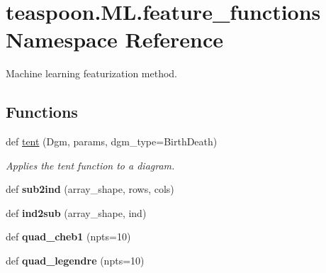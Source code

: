 \hypertarget{namespaceteaspoon_1_1_m_l_1_1feature__functions}{}\section{teaspoon.\+M\+L.\+feature\+\_\+functions Namespace Reference}
\label{namespaceteaspoon_1_1_m_l_1_1feature__functions}


Machine learning featurization method.  


\subsection*{Functions}
\begin{DoxyCompactItemize}
\item 
def \hyperlink{namespaceteaspoon_1_1_m_l_1_1feature__functions_ace7b405ff91ce6e4cd8f568a4f1dae29}{tent} (Dgm, params, dgm\+\_\+type=\textquotesingle{}Birth\+Death\textquotesingle{})
\begin{DoxyCompactList}\small\item\em Applies the tent function to a diagram. \end{DoxyCompactList}\item 
\mbox{\label{namespaceteaspoon_1_1_m_l_1_1feature__functions_adee0f8231e7fc52be86d4d4e0a2e6eac}} 
def {\bfseries sub2ind} (array\+\_\+shape, rows, cols)
\item 
\mbox{\label{namespaceteaspoon_1_1_m_l_1_1feature__functions_a2a2fba4def72b41faa705e925d9dd416}} 
def {\bfseries ind2sub} (array\+\_\+shape, ind)
\item 
\mbox{\label{namespaceteaspoon_1_1_m_l_1_1feature__functions_adf2e5ee87eca04ce8f2b4517f192bab1}} 
def {\bfseries quad\+\_\+cheb1} (npts=10)
\item 
\mbox{\label{namespaceteaspoon_1_1_m_l_1_1feature__functions_a3d4ddba126f4c77c6a1b09b82931117c}} 
def {\bfseries quad\+\_\+legendre} (npts=10)
\item 
\mbox{\label{namespaceteaspoon_1_1_m_l_1_1feature__functions_a828741de1525e78117d3e76cbba8bbc4}} 

\end{DoxyCompactItemize}
